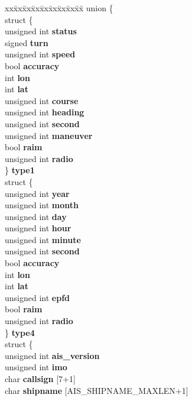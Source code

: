 \begin{DoxyCompactItemize}
\item 
\hypertarget{structais__t_a7d5d40d56aaf6f9fba3f4b87946ab51a}{\begin{tabbing}
xx\=xx\=xx\=xx\=xx\=xx\=xx\=xx\=xx\=\kill
union \{\\
\>struct \{\\
\>\>unsigned int {\bfseries status}\\
\>\>signed {\bfseries turn}\\
\>\>unsigned int {\bfseries speed}\\
\>\>bool {\bfseries accuracy}\\
\>\>int {\bfseries lon}\\
\>\>int {\bfseries lat}\\
\>\>unsigned int {\bfseries course}\\
\>\>unsigned int {\bfseries heading}\\
\>\>unsigned int {\bfseries second}\\
\>\>unsigned int {\bfseries maneuver}\\
\>\>bool {\bfseries raim}\\
\>\>unsigned int {\bfseries radio}\\
\>\} {\bfseries type1}\\
\>struct \{\\
\>\>unsigned int {\bfseries year}\\
\>\>unsigned int {\bfseries month}\\
\>\>unsigned int {\bfseries day}\\
\>\>unsigned int {\bfseries hour}\\
\>\>unsigned int {\bfseries minute}\\
\>\>unsigned int {\bfseries second}\\
\>\>bool {\bfseries accuracy}\\
\>\>int {\bfseries lon}\\
\>\>int {\bfseries lat}\\
\>\>unsigned int {\bfseries epfd}\\
\>\>bool {\bfseries raim}\\
\>\>unsigned int {\bfseries radio}\\
\>\} {\bfseries type4}\\
\>struct \{\\
\>\>unsigned int {\bfseries ais\_version}\\
\>\>unsigned int {\bfseries imo}\\
\>\>char {\bfseries callsign} \mbox{[}7+1\mbox{]}\\
\>\>char {\bfseries shipname} \mbox{[}AIS\_SHIPNAME\_MAXLEN+1\mbox{]}\\

\end{tabbing}}
\end{DoxyCompactItemize}
